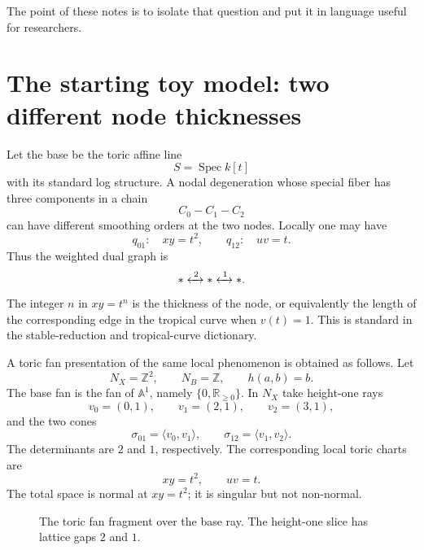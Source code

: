 \documentclass[11pt]{article}
\newcommand{\A}{\mathbb A}
\newcommand{\Z}{\mathbb Z}
\newcommand{\R}{\mathbb R}
\newcommand{\Spec}{\operatorname{Spec}}
\begin{document}
The point of these notes is to isolate that question and put it in language useful for researchers.

\section{The starting toy model: two different node thicknesses}

Let the base be the toric affine line
\[
S=\Spec k[t]
\]
with its standard log structure. A nodal degeneration whose special fiber has three components in a chain
\[
C_0 - C_1 - C_2
\]
can have different smoothing orders at the two nodes. Locally one may have
\[
q_{01}:\quad xy=t^2,
\qquad
q_{12}:\quad uv=t.
\]
Thus the weighted dual graph is
\[
\ast \xleftrightarrow{\;2\;} \ast \xleftrightarrow{\;1\;} \ast.
\]
The integer $n$ in $xy=t^n$ is the thickness of the node, or equivalently the length of the corresponding edge in the tropical curve when $v(t)=1$. This is standard in the stable-reduction and tropical-curve dictionary.

A toric fan presentation of the same local phenomenon is obtained as follows. Let
\[
N_X=\Z^2,
\qquad
N_B=\Z,
\qquad
h(a,b)=b.
\]
The base fan is the fan of $\A^1$, namely $\{0,\R_{\ge 0}\}$. In $N_X$ take height-one rays
\[
v_0=(0,1),\qquad v_1=(2,1),\qquad v_2=(3,1),
\]
and the two cones
\[
\sigma_{01}=\langle v_0,v_1\rangle,
\qquad
\sigma_{12}=\langle v_1,v_2\rangle.
\]
The determinants are $2$ and $1$, respectively. The corresponding local toric charts are
\[
xy=t^2,
\qquad
uv=t.
\]
The total space is normal at $xy=t^2$; it is singular but not non-normal.

\begin{figure}[h]
\centering
{}
\caption{The toric fan fragment over the base ray. The height-one slice has lattice gaps $2$ and $1$.}
\label{fig:fan}
\end{figure}
\end{document}
